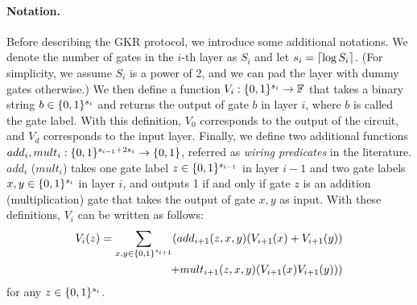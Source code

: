 \paragraph{Notation.} Before describing the GKR protocol, we introduce some additional notations. We denote the number of gates in the $i$-th layer as $S_i$ and let $s_i = {\lceil \log S_i \rceil}$. (For simplicity, we assume $S_i$ is a power of 2, and we can pad the layer with dummy gates otherwise.) We then define a function $V_i:\{0,1\}^{s_i}\rightarrow\mathbb{F}$ that takes a binary string $b\in\{0,1\}^{s_i}$ and returns the output of gate $b$ in layer $i$, where $b$ is called the gate label. With this definition, $V_0$ corresponds to the output of the circuit, and $V_d$ corresponds to the input layer. Finally, we define two additional functions $add_i, mult_i: \{0,1\}^{s_{i-1}+2s_i}\rightarrow\{0,1\}$, referred as \emph{wiring predicates} in the literature. $add_i$ ($mult_i$) takes one gate label $z\in\{0,1\}^{s_{i-1}}$ in layer $i-1$ and two gate labels $x,y\in\{0,1\}^{s_i}$ in layer $i$, and outputs 1 if and only if gate $z$ is an addition (multiplication) gate that takes the output of gate $x,y$ as input. With these definitions, $V_i$ can be written as follows:
\begin{equation}
    \begin{aligned}
	V_i(z)=\sum_{x, y \in\{0,1\}^{s_{i+1}}}(add_{i+1}(z,x,y)(V_{i+1}(x)+V_{i+1}(y))\\
	+mult_{i+1}(z,x,y)(V_{i+1}(x)V_{i+1}(y)))
	\end{aligned}
\end{equation}
for any $z\in\{0,1\}^{s_i}$. 









